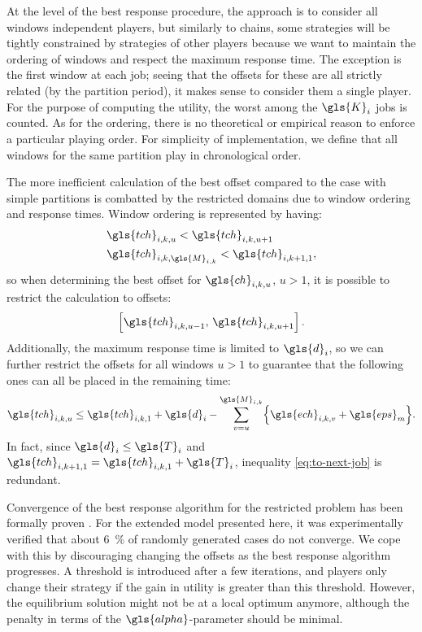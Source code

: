 \documentclass[main.tex]{subfiles}
\begin{document}
At the level of the best response procedure, the approach is to consider all windows independent players, but similarly to chains, some strategies will be tightly constrained by strategies of other players because we want to maintain the ordering of windows and respect the maximum response time.
The exception is the first window at each job; seeing that the offsets for these are all strictly related (by the partition period), it makes sense to consider them a single player.
For the purpose of computing the utility, the worst among the $\gls{K}_i$ jobs is counted.  
As for the ordering, there is no theoretical or empirical reason to enforce a particular playing order.
For simplicity of implementation, we define that all windows for the same partition play in chronological order.

The more inefficient calculation of the best offset compared to the case with simple partitions is combatted by the restricted domains due to window ordering and response times.
Window ordering is represented by having:
\begin{subequations}
\begin{align}
    &\gls{tch}_{i,k,u}<\gls{tch}_{i,k,u+1} \\
    &\gls{tch}_{i,k,\gls{M}_{i,k}}<\gls{tch}_{i,k+1,1}, \label{eq:to-next-job}
\end{align}
\end{subequations}
so when determining the best offset for $\gls{ch}_{i,k,u}$, $u>1$, it is possible to restrict the calculation to offsets:
\begin{align}
    \left[ \gls{tch}_{i,k,u-1},\,\gls{tch}_{i,k,u+1} \right].
\end{align}
Additionally, the maximum response time is limited to $\gls{d}_i$, so we can further restrict the offsets for all windows $u>1$ to guarantee that the following ones can all be placed in the remaining time:
\begin{align}
    \gls{tch}_{i,k,u} \leq \gls{tch}_{i,k,1}+\gls{d}_i-\sum_{v=u}^{\gls{M}_{i,k}}\braces*{\gls{ech}_{i,k,v}+\gls{eps}_m}.
\end{align}
In fact, since $\gls{d}_i\leq\gls{T}_i$ and $\gls{tch}_{i,k+1,1}=\gls{tch}_{i,k,1}+\gls{T}_i$, inequality \ref{eq:to-next-job} is redundant.

Convergence of the best response algorithm for the restricted problem has been formally proven \cite{al2012strictly}.
For the extended model presented here, it was experimentally verified that about \SI{6}{\percent} of randomly generated cases do not converge.
We cope with this by discouraging changing the offsets as the best response algorithm progresses.
A threshold is introduced after a few iterations, and players only change their strategy if the gain in utility is greater than this threshold.
However, the equilibrium solution might not be at a local optimum anymore, although the penalty in terms of the $\gls{alpha}$-parameter should be minimal.
\end{document}
